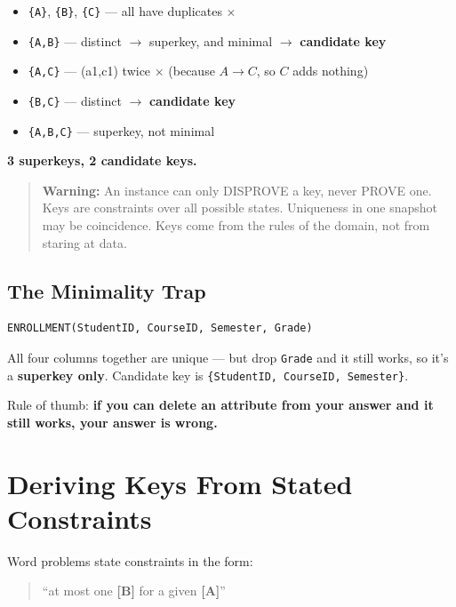 \documentclass[12pt]{article}
\begin{document}
\begin{itemize}
    \item \texttt{\{A\}}, \texttt{\{B\}}, \texttt{\{C\}} --- all have duplicates $\times$
    \item \texttt{\{A,B\}} --- distinct $\to$ superkey, and minimal $\to$ \textbf{candidate key} \checkmark
    \item \texttt{\{A,C\}} --- (a1,c1) twice $\times$ (because $A \to C$, so $C$ adds nothing)
    \item \texttt{\{B,C\}} --- distinct $\to$ \textbf{candidate key} \checkmark
    \item \texttt{\{A,B,C\}} --- superkey, not minimal
\end{itemize}

\textbf{3 superkeys, 2 candidate keys.}

\begin{quote}
\textbf{Warning:} An instance can only DISPROVE a key, never PROVE one. Keys are
constraints over all possible states. Uniqueness in one snapshot may be
coincidence. Keys come from the rules of the domain, not from staring at data.
\end{quote}

\subsection*{The Minimality Trap}

\begin{lstlisting}[style=plainschema]
ENROLLMENT(StudentID, CourseID, Semester, Grade)
\end{lstlisting}

All four columns together are unique --- but drop \texttt{Grade} and it still
works, so it's a \textbf{superkey only}. Candidate key is
\texttt{\{StudentID, CourseID, Semester\}}.

Rule of thumb: \textbf{if you can delete an attribute from your answer and it
still works, your answer is wrong.}

\section{Deriving Keys From Stated Constraints}

Word problems state constraints in the form:

\begin{quote}
``at most one \textbf{[B]} for a given \textbf{[A]}''
\end{quote}
\end{document}
